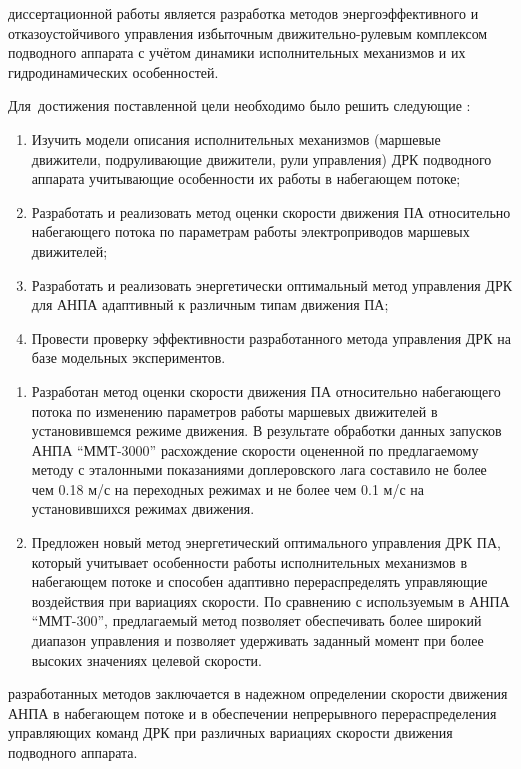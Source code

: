 {\aim} диссертационной работы является разработка методов энергоэффективного и отказоустойчивого управления избыточным движительно-рулевым комплексом подводного аппарата с учётом динамики исполнительных механизмов и их гидродинамических особенностей.

Для~достижения поставленной цели необходимо было решить следующие {\tasks}:
\begin{enumerate}[beginpenalty=10000] %
  \item Изучить модели описания исполнительных механизмов (маршевые движители, подруливающие движители, рули управления) ДРК подводного аппарата учитывающие особенности их работы в набегающем потоке;
  \item Разработать и реализовать метод оценки скорости движения ПА относительно набегающего потока по параметрам работы электроприводов маршевых движителей;
  \item Разработать и реализовать энергетически оптимальный метод управления ДРК для АНПА адаптивный к различным типам движения ПА;
  \item Провести проверку эффективности разработанного метода управления ДРК на базе модельных экспериментов.
\end{enumerate}

{\novelty}
\begin{enumerate}[beginpenalty=10000] %
  \item Разработан метод оценки скорости движения ПА относительно набегающего потока по изменению параметров работы маршевых движителей в установившемся режиме движения.
  В результате обработки данных запусков АНПА ``ММТ-3000'' расхождение скорости оцененной по предлагаемому методу с эталонными показаниями доплеровского лага составило не более чем 0.18 м/с на переходных режимах и не более чем 0.1 м/с на установившихся режимах движения.
  \item Предложен новый метод энергетический оптимального управления ДРК ПА, который учитывает особенности работы исполнительных механизмов в набегающем потоке и способен адаптивно перераспределять управляющие воздействия при вариациях скорости.
  По сравнению с используемым в АНПА ``ММТ-300'', предлагаемый метод позволяет обеспечивать более широкий диапазон управления и позволяет удерживать заданный момент при более высоких значениях целевой скорости.
\end{enumerate}
{\influence} разработанных методов заключается в надежном определении скорости движения АНПА в набегающем потоке и в обеспечении непрерывного перераспределения управляющих команд ДРК при различных вариациях скорости движения подводного аппарата.

